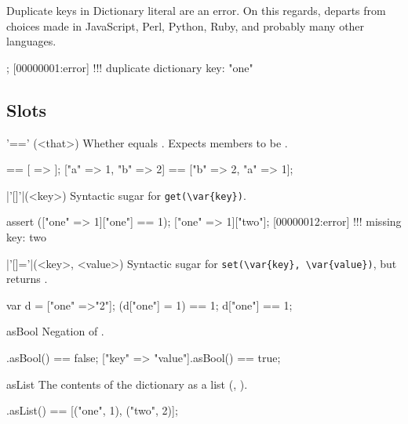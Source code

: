 Duplicate keys in Dictionary literal are an error.
On this regards, \us departs from choices made in JavaScript, Perl, Python,
Ruby, and probably many other languages.

\begin{urbiscript}
["one" => 1, "one" => 2];
[00000001:error] !!! duplicate dictionary key: "one"
\end{urbiscript}


\subsection{Slots}

\begin{urbiscriptapi}
\item['=='](<that>)%
  Whether \this equals .  Expects members to be
  .
\begin{urbiassert}
[ => ] == [ => ];
["a" => 1, "b" => 2] == ["b" => 2, "a" => 1];
\end{urbiassert}


\item|'[]'|(<key>)%
  Syntactic sugar for \lstinline|get(\var{key})|.

\begin{urbiscript}
assert (["one" => 1]["one"] == 1);
["one" => 1]["two"];
[00000012:error] !!! missing key: two
\end{urbiscript}


\item|'[]='|(<key>, <value>)%
  Syntactic sugar for \lstinline|set(\var{key}, \var{value})|, but returns
  .

\begin{urbiassert}
var d = ["one" =>"2"];
(d["one"] = 1) == 1;
d["one"] == 1;
\end{urbiassert}


\item[asBool]
  Negation of .
\begin{urbiassert}
[=>].asBool() == false;
["key" => "value"].asBool() == true;
\end{urbiassert}


\item[asList]%
  The contents of the dictionary as a  list (,
  ).

\begin{urbiassert}
["one" => 1, "two" => 2].asList() == [("one", 1), ("two", 2)];
\end{urbiassert}


\end{urbiscriptapi}
